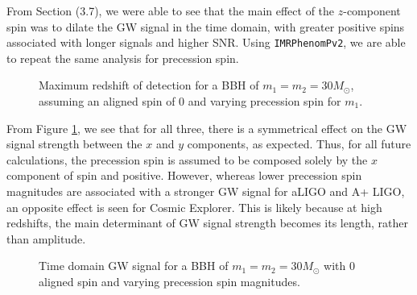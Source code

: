 \documentclass{article}
\begin{document}
From Section (3.7), we were able to see that the main effect of the $z$-component spin was to dilate the GW signal in the time domain, with greater positive spins associated with longer signals and higher SNR. Using \texttt{IMRPhenomPv2}, we are able to repeat the same analysis for precession spin. 

\begin{figure}[!htb]
    \caption{\label{fig:zchip} Maximum redshift of detection for a BBH of $m_1 = m_2 = 30 M_\odot$, assuming an aligned spin of $0$ and varying precession spin for $m_1$.}
\end{figure}

From Figure \ref{fig:zchip}, we see that for all three, there is a symmetrical effect on the GW signal strength between the $x$ and $y$ components, as expected. Thus, for all future calculations, the precession spin is assumed to be composed solely by the $x$ component of spin and positive. However, whereas lower precession spin magnitudes are associated with a stronger GW signal for aLIGO and A+ LIGO, an opposite effect is seen for Cosmic Explorer. This is likely because at high redshifts, the main determinant of GW signal strength becomes its length, rather than amplitude. \\

\begin{figure}[!htb]
    \caption{\label{fig:timechip} Time domain GW signal for a BBH of $m_1 = m_2 = 30 M_\odot$ with $0$ aligned spin and varying precession spin magnitudes.}
\end{figure}
\end{document}
